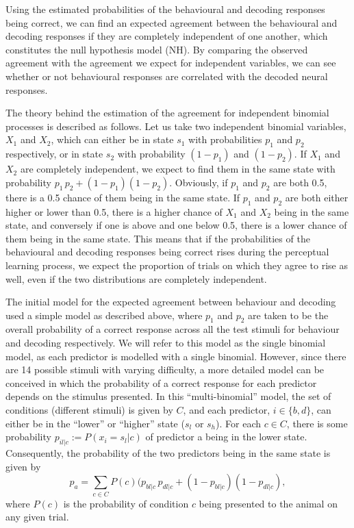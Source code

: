 Using the estimated probabilities of the behavioural and decoding responses being correct, we can find an expected agreement between the behavioural and decoding responses if they are completely independent of one another, which constitutes the null hypothesis model (NH). By comparing the observed agreement with the agreement we expect for independent variables, we can see whether or not behavioural responses are correlated with the decoded neural responses.

The theory behind the estimation of the agreement for independent binomial processes is described as follows. Let us take two independent binomial variables, $X_1$ and $X_2$, which can either be in state $s_1$ with probabilities $p_1$ and $p_2$ respectively, or in state $s_2$ with probability $(1-p_1)$ and $(1-p_2)$.
If $X_1$ and $X_2$ are completely independent, we expect to find them in the same state with probability $p_1 \, p_2 + (1-p_1) (1-p_2)$. Obviously, if $p_1$ and $p_2$ are both 0.5, there is a 0.5 chance of them being in the same state.
If $p_1$ and $p_2$ are both either higher or lower than 0.5, there is a higher chance of $X_1$ and $X_2$ being in the same state, and conversely if one is above and one below 0.5, there is a lower chance of them being in the same state. This means that if the probabilities of the behavioural and decoding responses being correct rises during the perceptual learning process, we expect the proportion of trials on which they agree to rise as well, even if the two distributions are completely independent.

The initial model for the expected agreement between behaviour and decoding used a simple model as described above, where $p_1$ and $p_2$ are taken to be the overall probability of a correct response across all the test stimuli for behaviour and decoding respectively. We will refer to this model as the single binomial model, as each predictor is modelled with a single binomial.
However, since there are 14 possible stimuli with varying difficulty, a more detailed model can be conceived in which the probability of a correct response for each predictor depends on the stimulus presented. In this ``multi-binomial'' model, the set of conditions (different stimuli) is given by $C$, and each predictor, $i\in\{b,d\}$, can either be in the ``lower'' or ``higher'' state ($s_l$ or $s_h$).
For each $c\in C$, there is some probability $p_{il|c} := P(x_i=s_l|c)$ of predictor a being in the lower state. Consequently, the probability of the two predictors being in the same state is given by
$$p_a = \sum_{c\in C} P(c) (p_{bl|c} \, p_{dl|c} + (1-p_{bl|c}) (1-p_{dl|c}),$$
where $P(c)$ is the probability of condition $c$ being presented to the animal on any given trial.

